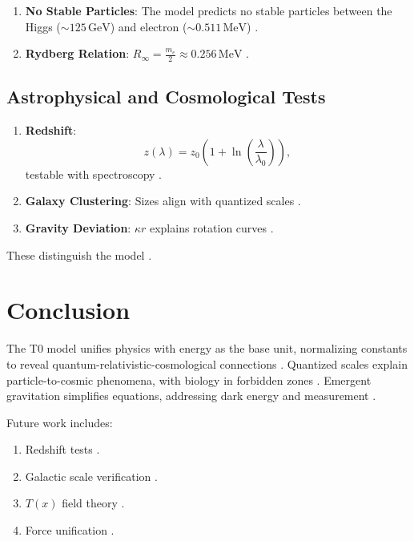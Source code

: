 \documentclass[twocolumn,aps,prl]{revtex4-2}
\begin{document}
	\begin{enumerate}
		\item \textbf{No Stable Particles}: The model predicts no stable particles between the Higgs ($\sim 125 \, \text{GeV}$) and electron ($\sim 0.511 \, \text{MeV}$) \cite{ATLAS2012, CMS2012, Ellis1976}.
		\item \textbf{Rydberg Relation}: $R_\infty = \frac{m_e}{2} \approx 0.256 \, \text{MeV}$ \cite{Hansch2006, Udem2002}.
	\end{enumerate}
	
	\subsection{Astrophysical and Cosmological Tests}
	\label{subsec:astro_tests}
	
	\begin{enumerate}
		\item \textbf{Redshift}: 
		\begin{equation}
			z(\lambda) = z_0 \left(1 + \ln\left(\frac{\lambda}{\lambda_0}\right)\right), \label{eq:redshift_correction}
		\end{equation}
		testable with spectroscopy \cite{Arp1987, Gardner2006, Dewdney2009}.
		\item \textbf{Galaxy Clustering}: Sizes align with quantized scales \cite{Disney2008, Courteau2014, Laureijs2011, Ivezic2019}.
		\item \textbf{Gravity Deviation}: $\kappa r$ explains rotation curves \cite{McGaugh2016, Milgrom1983}.
	\end{enumerate}
	
	These distinguish the model \cite{Popper1959}.
	
	\section{Conclusion}
	\label{sec:conclusion}
	
	The T0 model unifies physics with energy as the base unit, normalizing constants to reveal quantum-relativistic-cosmological connections \cite{Einstein1921, Hawking2010}. Quantized scales explain particle-to-cosmic phenomena, with biology in forbidden zones \cite{Schrodinger1944, Lambert2013}. Emergent gravitation simplifies equations, addressing dark energy and measurement \cite{Anderson1972, Laughlin2000, Riess1998, Zurek2003}.
	
	Future work includes:
	\begin{enumerate}
		\item Redshift tests \cite{LSST2009}.
		\item Galactic scale verification \cite{Scargle2013}.
		\item $T(x)$ field theory \cite{pascher_qft_2025}.
		\item Force unification \cite{Yang1954}.
	\end{enumerate}
	
\end{document}
